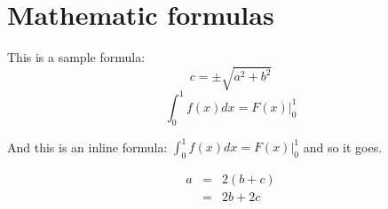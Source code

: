 
\section{Mathematic formulas}
This is a sample formula:
$$ c = \pm\sqrt{a^2 + b^2} $$
\begin{displaymath}
\int_0^1 f(x)dx = F(x)|_0^1
\end{displaymath}

And this is an inline formula: $\int_0^1 f(x)dx = F(x)|_0^1$ and
so it goes.

\begin{eqnarray}
  a &=& 2(b+c) \\
    &=& 2b + 2c
\end{eqnarray}